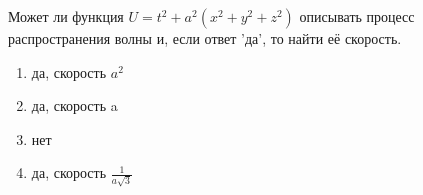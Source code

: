 Может ли функция \(U=t^2+a^2\left(x^2 + y^2+z^2\right)\) описывать процесс распространения волны и, если ответ 'да', то найти её скорость.

\begin{enumerate}[label=\arabic*)]
    \item да, скорость \(a^2\)
    \item да, скорость a
    \item нет
    \item да, скорость \(\frac{1}{a\sqrt{3}}\)
\end{enumerate}

